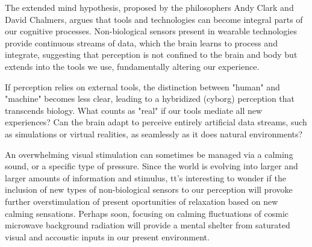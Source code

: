 The extended mind hypothesis, proposed by the philosophers Andy Clark and David Chalmers, argues that tools and technologies can become integral parts of our cognitive processes. Non-biological sensors present in wearable technologies provide continuous streams of data, which the brain learns to process and integrate, suggesting that perception is not confined to the brain and body but extends into the tools we use, fundamentally altering our experience.

If perception relies on external tools, the distinction between "human" and "machine" becomes less clear, leading to a hybridized (cyborg) perception that transcends biology. What counts as "real" if our tools mediate all new experiences? Can the brain adapt to perceive entirely artificial data streams, such as simulations or virtual realities, as seamlessly as it does natural environments?

An overwhelming visual stimulation can sometimes be managed via a calming sound, or a specific type of pressure. Since the world is evolving into larger and larger amounts of information and stimulus, tt's interesting to wonder if the inclusion of new types of non-biological sensors to our perception will provoke further overstimulation of present oportunities of relaxation based on new calming sensations. Perhaps soon, focusing on  calming fluctuations of cosmic microwave background radiation will provide a mental shelter from saturated visual and accoustic inputs in our present environment.      


